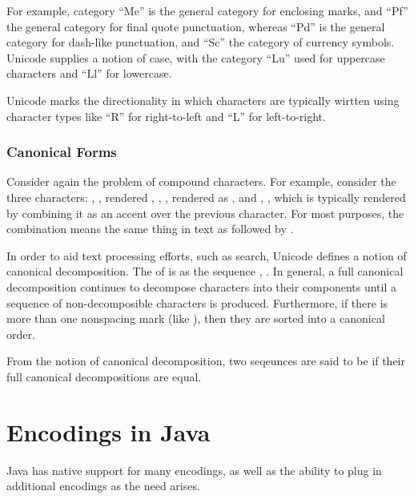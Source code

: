 For example, category ``Me'' is the general category for enclosing
marks, and ``Pf'' the general category for final quote punctuation,
whereas ``Pd'' is the general category for dash-like punctuation, and
``Sc'' the category of currency symbols.  Unicode supplies a notion of
case, with the category ``Lu'' used for uppercase characters and
``Ll'' for lowercase.

Unicode marks the directionality in which characters are typically
wirtten using character types like ``R'' for right-to-left
and ``L'' for left-to-right.

\subsubsection{Canonical Forms}

Consider again the problem of compound characters.  For example,
consider the three characters: ,
, rendered
, , , 
rendered as , and ,
, which is typically rendered
by combining it as an accent over the previous character.  For most
purposes, the combination  means the same thing in text
as  followed by .

In order to aid text processing efforts, such as search, Unicode
defines a notion of canonical decomposition.  The  of  is
as the sequence ,
.  In general, a full canonical decomposition continues
to decompose characters into their components until a sequence of
non-decomposible characters is produced.  Furthermore, if there is
more than one nonspacing mark (like ), then they are
sorted into a canonical order.

From the notion of canonical decomposition, two seqeunces are said to
be  if their
full canonical decompositions are equal.


\section{Encodings in Java}

Java has native support for many encodings, as well as the ability
to plug in additional encodings as the need arises.


